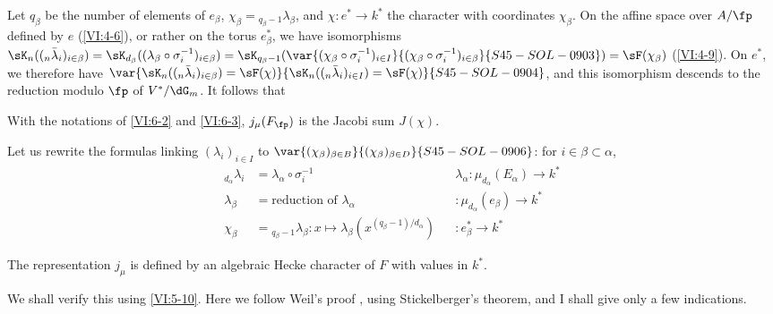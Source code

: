 Let $q_\beta$ be the number of elements of $e_\beta$, 
  $\chi_\beta={}_{q_\beta-1}\lambda_\beta$, and 
$\chi:e^\ast \to k^\ast$ the character with coordinates $\chi_\beta$. On the 
affine space over $A/\fp$ defined by $e$ (\ref{VI:4-6}), or rather on the torus 
$e_\beta^\ast$, we have isomorphisms 
  $\sK_n((_n\bar\lambda_i)_{i\in\beta}) = \sK_{d_\beta}((\lambda_\beta \circ \sigma_i^{-1})_{i\in\beta}) =\sK_{q_\beta-1}(\var{(\chi_\beta\circ \sigma_i^{-1})_{i\in I}}{(\chi_\beta\circ \sigma_i^{-1})_{i\in\beta}}{S45-SOL-0903}) = \sF(\chi_\beta)$ (\ref{VI:4-9}). 
  On $e^\ast$, we therefore have $\var{\sK_n((_n\bar\lambda_i)_{i\in \beta}) = \sF(\chi)}{\sK_n((_n\bar\lambda_i)_{i\in I}) = \sF(\chi)}{S45-SOL-0904}$, 
and this isomorphism descends to the reduction modulo $\fp$ of $V^\ast/\dG_m$. 
It follows that





\begin{proposition_}\label{VI:6-4}
With the notations of \ref{VI:6-2} and \ref{VI:6-3}, $j_\mu(F_\fp)$ is the 
Jacobi sum $J(\chi)$. 
\end{proposition_}

Let us rewrite the formulas linking $(\lambda_i)_{i\in I}$ to 
  $\var{(\chi_\beta)_{\beta\in B}}{(\chi_\beta)_{\beta\in D}}{S45-SOL-0906}$: for $i\in \beta\subset \alpha$, 
\begin{align*}
  _{d_\alpha} \lambda_i &= \lambda_\alpha\circ \sigma_i^{-1} && \lambda_\alpha:\mu_{d_\alpha}(E_\alpha) \to k^\ast \\
  \lambda_\beta &= \text{reduction of $\lambda_\alpha$} && :\mu_{d_\alpha}(e_\beta) \to k^\ast \\
  \chi_\beta &= {}_{q_\beta-1}\lambda_\beta: x\mapsto \lambda_\beta(x^{(q_\beta-1)/d_\alpha}) && :e_\beta^\ast \to k^\ast 
\end{align*}





\begin{theorem_}\label{VI:6-5}
The representation $j_\mu$ is defined by an algebraic Hecke character 
of $F$ with values in $k^\ast$. 
\end{theorem_}

We shall verify this using \ref{VI:5-10}. Here we follow Weil's 
proof \cite{we52,we74-2}, using Stickelberger's theorem, 
and I shall give only a few indications. 





